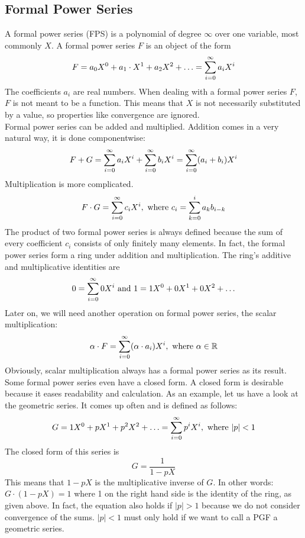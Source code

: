 \subsection{Formal Power Series}
A formal power series (FPS) \cite{wilf:generatingfunctionology} is a polynomial of degree $\infty$ over one variable, most commonly $X$.
A formal power series $F$ is an object of the form
\[ F = a_0 X^0 + a_1 \cdot X^1 + a_2 X^2 + \ldots = \sum\limits_{i = 0}^{\infty} a_i X^i \]
The coefficients $a_i$ are real numbers.
When dealing with a formal power series $F$, $F$ is not meant to be a function.
This means that $X$ is not necessarily substituted by a value, so properties like convergence are ignored. \\
Formal power series can be added and multiplied.
Addition comes in a very natural way, it is done componentwise:
\[ F + G = \sum\limits_{i = 0}^{\infty} a_i X^i + \sum\limits_{i = 0}^{\infty} b_i X^i
	= \sum\limits_{i = 0}^{\infty} (a_i + b_i) X^i \]
Multiplication is more complicated.
\[ F \cdot G = \sum\limits_{i = 0}^{\infty} c_i X^i , \text{ where } c_i = \sum_{k = 0}^{i} a_k b_{i-k} \]
The product of two formal power series is always defined because the sum of every coefficient $c_i$ consists of only finitely many elements.
In fact, the formal power series form a ring under addition and multiplication.
The ring's additive and multiplicative identities are
\[ 0 = \sum\limits_{i = 0}^{\infty} 0 X^i \text{ and } 1 = 1 X^0 + 0 X^1 + 0 X^2 + \ldots \]
Later on, we will need another operation on formal power series, the scalar multiplication:
\[ \alpha \cdot F = \sum\limits_{i = 0}^{\infty} (\alpha \cdot a_i) X^i , \text{ where } \alpha \in \mathbb{R} \]
Obviously, scalar multiplication always has a formal power series as its result.
Some formal power series even have a closed form.
A closed form is desirable because it eases readability and calculation.
As an example, let us have a look at the geometric series.
It comes up often and is defined as follows:
\[ G = 1 X^0 + p X^1 + p^2 X^2 + \ldots = \sum\limits_{i = 0}^{\infty} p^i X^i , \text{ where } |p| < 1 \]
The closed form of this series is
\[ G = \frac{1}{1 - pX} \]
This means that $1 - pX$ is the multiplicative inverse of $G$.
In other words: $G \cdot (1 - pX) = 1$ where 1 on the right hand side is the identity of the ring, as given above.
In fact, the equation also holds if $|p| > 1$ because we do not consider convergence of the sums.
$|p| < 1$ must only hold if we want to call a PGF a geometric series.

